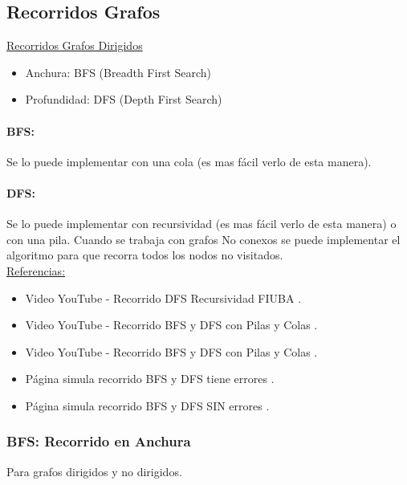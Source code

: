 \documentclass[../main.tex]{subfiles}
\begin{document}
    \subsection{Recorridos Grafos}
        \underline{Recorridos Grafos Dirigidos}
        \begin{itemize}
            \item Anchura: BFS (Breadth First Search)
            \item Profundidad: DFS (Depth First Search)
        \end{itemize}

    
        \paragraph{BFS:} Se lo puede implementar con una cola (es mas fácil verlo de esta manera).
        \paragraph{DFS:} Se lo puede implementar con recursividad (es mas fácil verlo de esta manera) o con una pila. Cuando se trabaja con grafos No conexos se puede implementar el algoritmo para que recorra todos los nodos no visitados.\\

        \underline{Referencias:}
        \begin{itemize}
            \item Video YouTube - Recorrido DFS Recursividad FIUBA \cite{grafo_dfs_recursividad_youtube}.
            \item Video YouTube - Recorrido BFS y DFS con Pilas y Colas  \cite{grafo_bfs_dfs_youtube_1}.
            \item Video YouTube - Recorrido BFS y DFS con Pilas y Colas  \cite{grafo_bfs_dfs_youtube_2}.
            \item Página simula recorrido BFS y DFS tiene errores \cite{grafo_bfs_dfs_simulacion_1}.
            \item Página simula recorrido BFS y DFS SIN errores \cite{grafo_bfs_dfs_simulacion_2}.
        \end{itemize}


        \subsubsection{BFS: Recorrido en Anchura}
            Para grafos dirigidos y no dirigidos.\\
            
\end{document}
